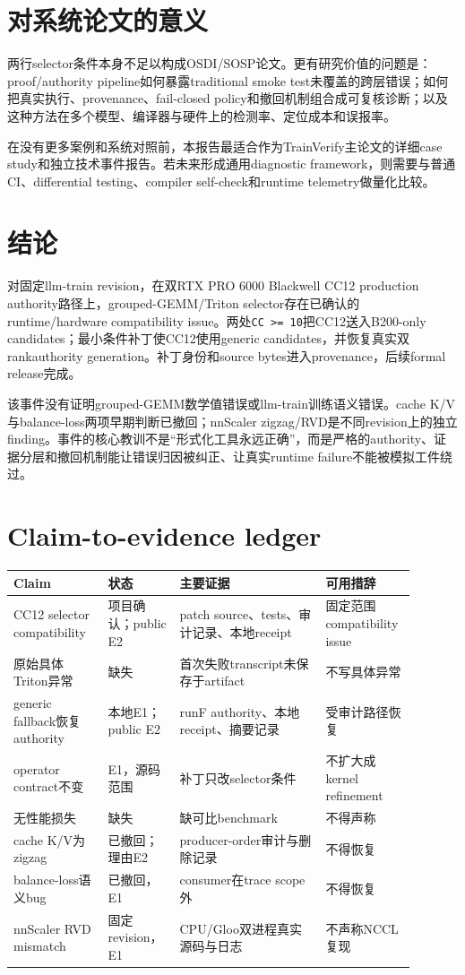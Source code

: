 \documentclass[10.5pt,a4paper]{ctexart}
\begin{document}
\section{对系统论文的意义}

两行selector条件本身不足以构成OSDI/SOSP论文。更有研究价值的问题是：proof/authority pipeline如何暴露traditional smoke test未覆盖的跨层错误；如何把真实执行、provenance、fail-closed policy和撤回机制组合成可复核诊断；以及这种方法在多个模型、编译器与硬件上的检测率、定位成本和误报率。

在没有更多案例和系统对照前，本报告最适合作为TrainVerify主论文的详细case study和独立技术事件报告。若未来形成通用diagnostic framework，则需要与普通CI、differential testing、compiler self-check和runtime telemetry做量化比较。

\section{结论}

对固定llm-train revision，在双RTX PRO 6000 Blackwell CC12 production authority路径上，grouped-GEMM/Triton selector存在已确认的runtime/hardware compatibility issue。两处\texttt{CC >= 10}把CC12送入B200-only candidates；最小条件补丁使CC12使用generic candidates，并恢复真实双rankauthority generation。补丁身份和source bytes进入provenance，后续formal release完成。

该事件没有证明grouped-GEMM数学值错误或llm-train训练语义错误。cache K/V与balance-loss两项早期判断已撤回；nnScaler zigzag/RVD是不同revision上的独立finding。事件的核心教训不是“形式化工具永远正确”，而是严格的authority、证据分层和撤回机制能让错误归因被纠正、让真实runtime failure不能被模拟工件绕过。

\appendix
\section{Claim-to-evidence ledger}

\begin{longtable}{L{0.22\linewidth}L{0.16\linewidth}L{0.34\linewidth}L{0.17\linewidth}}
\toprule
Claim & 状态 & 主要证据 & 可用措辞 \\
\midrule
CC12 selector compatibility & 项目确认；public E2 & patch source、tests、审计记录、本地receipt & 固定范围compatibility issue \\
原始具体Triton异常 & 缺失 & 首次失败transcript未保存于artifact & 不写具体异常 \\
generic fallback恢复authority & 本地E1；public E2 & runF authority、本地receipt、摘要记录 & 受审计路径恢复 \\
operator contract不变 & E1，源码范围 & 补丁只改selector条件 & 不扩大成kernel refinement \\
无性能损失 & 缺失 & 缺可比benchmark & 不得声称 \\
cache K/V为zigzag & 已撤回；理由E2 & producer-order审计与删除记录 & 不得恢复 \\
balance-loss语义bug & 已撤回，E1 & consumer在trace scope外 & 不得恢复 \\
nnScaler RVD mismatch & 固定revision，E1 & CPU/Gloo双进程真实源码与日志 & 不声称NCCL复现 \\
\bottomrule
\end{longtable}
\end{document}
